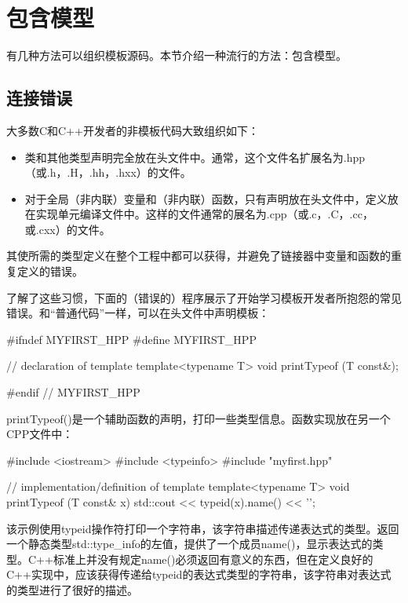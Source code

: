 \section{包含模型}


有几种方法可以组织模板源码。本节介绍一种流行的方法：包含模型。

\subsection{连接错误}

大多数C和C++开发者的非模板代码大致组织如下：

\begin{itemize}
\item
类和其他类型声明完全放在头文件中。通常，这个文件名扩展名为.hpp（或.h，.H，.hh，.hxx）的文件。

\item
对于全局（非内联）变量和（非内联）函数，只有声明放在头文件中，定义放在实现单元编译文件中。这样的文件通常的展名为.cpp（或.c，.C，.cc，或.cxx）的文件。
\end{itemize}

其使所需的类型定义在整个工程中都可以获得，并避免了链接器中变量和函数的重复定义的错误。

了解了这些习惯，下面的（错误的）程序展示了开始学习模板开发者所抱怨的常见错误。和“普通代码”一样，可以在头文件中声明模板：

\begin{cpp}
#ifndef MYFIRST_HPP
#define MYFIRST_HPP

// declaration of template
template<typename T>
void printTypeof (T const&);

#endif // MYFIRST_HPP
\end{cpp}

printTypeof()是一个辅助函数的声明，打印一些类型信息。函数实现放在另一个CPP文件中：

\begin{cpp}
#include <iostream>
#include <typeinfo>
#include "myfirst.hpp"

// implementation/definition of template
template<typename T>
void printTypeof (T const& x)
{
	std::cout << typeid(x).name() << '\n';
}
\end{cpp}

该示例使用typeid操作符打印一个字符串，该字符串描述传递表达式的类型。返回一个静态类型std::type\_info的左值，提供了一个成员name()，显示表达式的类型。C++标准上并没有规定name()必须返回有意义的东西，但在定义良好的C++实现中，应该获得传递给typeid的表达式类型的字符串，该字符串对表达式的类型进行了很好的描述。
 
